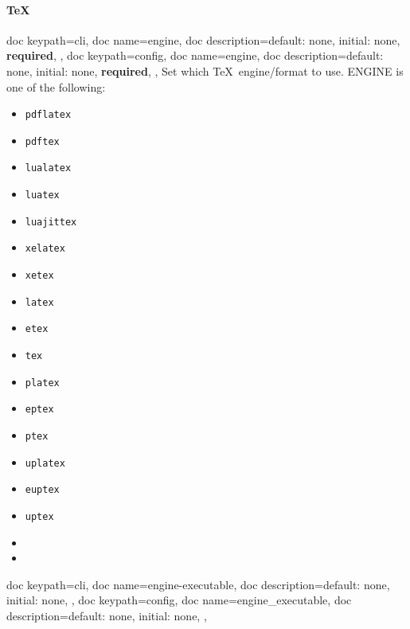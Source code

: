 \documentclass[a4paper, 11pt]{scrartcl}
\newcommand\metavar[1]{\textnormal{\textsf{#1}}}
\begin{document}
\paragraph{\TeX}
\begin{docKeys}[
		doc parameter={=\meta{engine}},
	]{
		{
			doc keypath=cli,
			doc name=engine,
			doc description={default: none, initial: none, \textcolor{CtpRed}{\bfseries\sffamily required}},
		},
		{
			doc keypath=config,
			doc name=engine,
			doc description={default: none, initial: none, \textcolor{CtpRed}{\bfseries\sffamily required}},
		},
	}
	Set which \TeX\ engine/format to use.
	\metavar{ENGINE} is one of the following:
	\begin{multicols}{3}
		\begin{itemize}
			\item \texttt{pdflatex}
			\item \texttt{pdftex}
			\item \texttt{lualatex}
			\item \texttt{luatex}
			\item \texttt{luajittex}
			\item \texttt{xelatex}
			\item \texttt{xetex}
			\item \texttt{latex}
			\item \texttt{etex}
			\item \texttt{tex}
			\item \texttt{platex}
			\item \texttt{eptex}
			\item \texttt{ptex}
			\item \texttt{uplatex}
			\item \texttt{euptex}
			\item \texttt{uptex}
			\item[]
			\item[]
		\end{itemize}
	\end{multicols}
\end{docKeys}
\begin{docKeys}[
		doc parameter={=\meta{engine\_executable}},
	]{
		{
			doc keypath=cli,
			doc name=engine-executable,
			doc description={default: none, initial: none},
		},
		{
			doc keypath=config,
			doc name=engine_executable,
			doc description={default: none, initial: none},
		},
	}
\end{docKeys}
\end{document}
